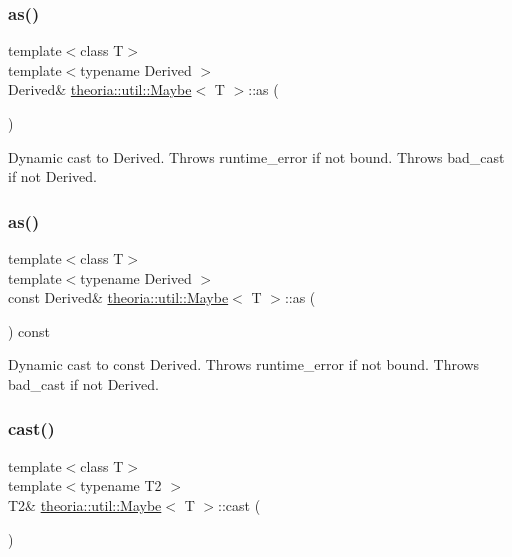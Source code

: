 \subsubsection{\texorpdfstring{as()}{as()}\hspace{0.1cm}{\footnotesize\ttfamily [1/2]}}
{\footnotesize\ttfamily template$<$class T$>$ \\
template$<$typename Derived $>$ \\
Derived\& \hyperlink{classtheoria_1_1util_1_1Maybe}{theoria\+::util\+::\+Maybe}$<$ T $>$\+::as (\begin{DoxyParamCaption}{ }\end{DoxyParamCaption})\hspace{0.3cm}{\ttfamily [inline]}}

Dynamic cast to Derived. Throws runtime\+\_\+error if not bound. Throws bad\+\_\+cast if not Derived. \mbox{\label{classtheoria_1_1util_1_1Maybe_a5a30bc268a9bdb9f7a174d36d13754df}} 
\subsubsection{\texorpdfstring{as()}{as()}\hspace{0.1cm}{\footnotesize\ttfamily [2/2]}}
{\footnotesize\ttfamily template$<$class T$>$ \\
template$<$typename Derived $>$ \\
const Derived\& \hyperlink{classtheoria_1_1util_1_1Maybe}{theoria\+::util\+::\+Maybe}$<$ T $>$\+::as (\begin{DoxyParamCaption}{ }\end{DoxyParamCaption}) const\hspace{0.3cm}{\ttfamily [inline]}}

Dynamic cast to const Derived. Throws runtime\+\_\+error if not bound. Throws bad\+\_\+cast if not Derived. \mbox{\label{classtheoria_1_1util_1_1Maybe_ae0db05f1fe430871069bd08d53bf4928}} 
\subsubsection{\texorpdfstring{cast()}{cast()}\hspace{0.1cm}{\footnotesize\ttfamily [1/2]}}
{\footnotesize\ttfamily template$<$class T$>$ \\
template$<$typename T2 $>$ \\
T2\& \hyperlink{classtheoria_1_1util_1_1Maybe}{theoria\+::util\+::\+Maybe}$<$ T $>$\+::cast (\begin{DoxyParamCaption}{ }\end{DoxyParamCaption})\hspace{0.3cm}{\ttfamily [inline]}}

